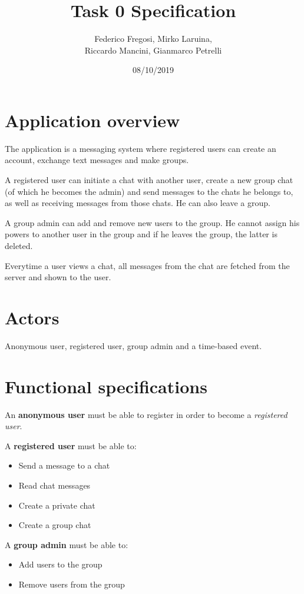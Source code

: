 \documentclass[titlepage, 12pt]{article}
\title{Task 0 Specification}
\date{08/10/2019}
\author{Federico Fregosi, Mirko Laruina, \\Riccardo Mancini, Gianmarco Petrelli}
\begin{document}
\maketitle

\section{Application overview}
The application is a messaging system where registered users can create an 
account, exchange text messages and make groups.

A registered user can initiate a chat with another user, create a new group chat
(of which he becomes the admin) and send messages to the chats he belongs to,
as well as receiving messages from those chats. He can also leave a group.

A group admin can add and remove new users to the group. He cannot assign his
powers to another user in the group and if he leaves the group, the latter 
is deleted.

Everytime a user views a chat, all messages from the chat are fetched from 
the server and shown to the user.

\section{Actors}
Anonymous user, registered user, group admin and a time-based event.

\section{Functional specifications}
An \textbf{anonymous user} must be able to register in order to become a 
\emph{registered user}.

A \textbf{registered user} must be able to:
\begin{itemize}
    \item Send a message to a chat
    \item Read chat messages
    \item Create a private chat
    \item Create a group chat
\end{itemize}

A \textbf{group admin} must be able to:
\begin{itemize}
    \item Add users to the group
    \item Remove users from the group
\end{itemize}
\end{document}
